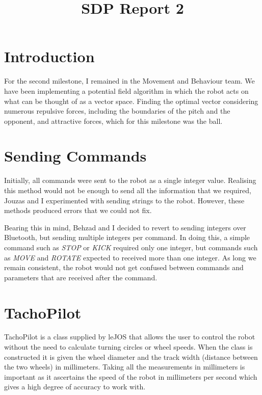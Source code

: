 \documentclass[conference,12pt]{IEEEtran}
\begin{document}
	
\title{SDP Report 2}

\author{
}
	
\maketitle

\IEEEpeerreviewmaketitle

\section{Introduction}
For the second milestone, I remained in the Movement and Behaviour team. We have been implementing a potential field algorithm in which the robot acts on what can be thought of as a vector space. Finding the optimal vector considering numerous repulsive forces, including the boundaries of the pitch and the opponent, and attractive forces, which for this milestone was the ball.
	
\section{Sending Commands}
Initially, all commands were sent to the robot as a single integer value. Realising this method would not be enough to send all the information that we required, Jouzas and I experimented with sending strings to the robot. However, these methods produced errors that we could not fix.

Bearing this in mind, Behzad and I decided to revert to sending integers over Bluetooth, but sending multiple integers per command. In doing this, a simple command such as \textit{STOP} or \textit{KICK} required only one integer, but commands such as \textit{MOVE} and \textit{ROTATE} expected to received more than one integer. As long we remain consistent, the robot would not get confused between commands and parameters that are received after the command.

\section{TachoPilot}
TachoPilot is a class supplied by leJOS that allows the user to control the robot without the need to calculate turning circles or wheel speeds. When the class is constructed it is given the wheel diameter and the track width (distance between the two wheels) in millimeters. Taking all the measurements in millimeters is important as it ascertains the speed of the robot in millimeters per second which gives a high degree of accuracy to work with.
\end{document}
